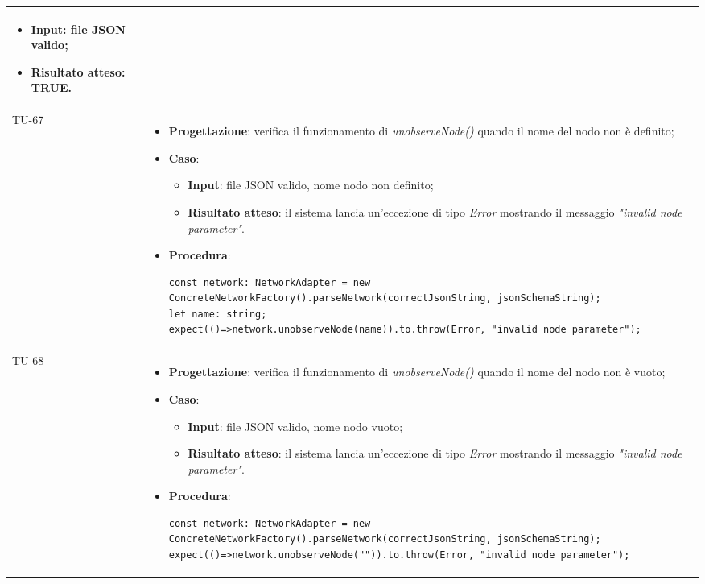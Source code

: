 \begin{longtable}{|C{1.5cm}|C{14.5cm}|}
\begin{itemize}
	\begin{itemize}
		\item \textbf{Input}: file JSON valido;
		\item \textbf{Risultato atteso}: TRUE.
	\end{itemize}
\end{itemize}\\
\hline
{TU-67} &
\begin{itemize}
	\item \textbf{Progettazione}: verifica il funzionamento di \emph{unobserveNode()} quando il nome del nodo non è definito;
	\item \textbf{Caso}: 
	\begin{itemize}
		\item \textbf{Input}: file JSON valido, nome nodo non definito;
		\item \textbf{Risultato atteso}: il sistema lancia un'eccezione di tipo \emph{Error} mostrando il messaggio \emph{"invalid node parameter"}.
	\end{itemize}
	\item \textbf{Procedura}:
	\begin{lstlisting}
const network: NetworkAdapter = new ConcreteNetworkFactory().parseNetwork(correctJsonString, jsonSchemaString);
let name: string;
expect(()=>network.unobserveNode(name)).to.throw(Error, "invalid node parameter");
	\end{lstlisting}
\end{itemize}\\
\hline
{TU-68} &
\begin{itemize}
	\item \textbf{Progettazione}: verifica il funzionamento di \emph{unobserveNode()} quando il nome del nodo non è vuoto;
	\item \textbf{Caso}: 
	\begin{itemize}
		\item \textbf{Input}: file JSON valido, nome nodo vuoto;
		\item \textbf{Risultato atteso}: il sistema lancia un'eccezione di tipo \emph{Error} mostrando il messaggio \emph{"invalid node parameter"}.
	\end{itemize}
	\item \textbf{Procedura}:
	\begin{lstlisting}
const network: NetworkAdapter = new ConcreteNetworkFactory().parseNetwork(correctJsonString, jsonSchemaString);
expect(()=>network.unobserveNode("")).to.throw(Error, "invalid node parameter");
	\end{lstlisting}

\end{itemize}
\end{longtable}
